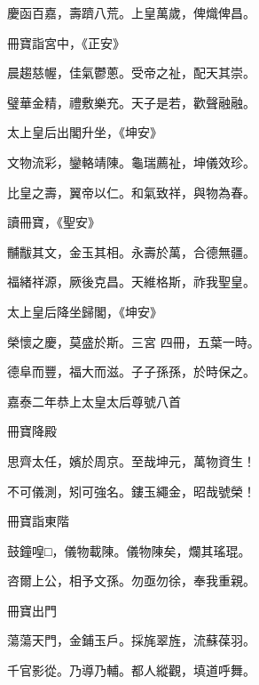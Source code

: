 \begin{pinyinscope}
 慶函百嘉，壽躋八荒。上皇萬歲，俾熾俾昌。



 冊寶詣宮中，《正安》



 晨趨慈幄，佳氣鬱蔥。受帝之祉，配天其崇。



 璧華金精，禮敷樂充。天子是若，歡聲融融。



 太上皇后出閣升坐，《坤安》



 文物流彩，鑾輅靖陳。龜瑞薦祉，坤儀效珍。



 比皇之壽，翼帝以仁。和氣致祥，與物為春。



 讀冊寶，《聖安》



 黼黻其文，金玉其相。永壽於萬，合德無疆。



 福緒祥源，厥後克昌。天維格斯，祚我聖皇。



 太上皇后降坐歸閣，《坤安》



 榮懷之慶，莫盛於斯。三宮
 四冊，五葉一時。



 德阜而豐，福大而滋。子子孫孫，於時保之。



 嘉泰二年恭上太皇太后尊號八首



 冊寶降殿



 思齊太任，嬪於周京。至哉坤元，萬物資生！



 不可儀測，矧可強名。鏤玉繩金，昭哉號榮！



 冊寶詣東階



 鼓鐘喤□，儀物載陳。儀物陳矣，爛其瑤琨。



 咨爾上公，相予文孫。勿亟勿徐，奉我重親。



 冊寶出門



 蕩蕩天門，金鋪玉戶。採旄翠旌，流蘇葆羽。



 千官影從。乃導乃輔。都人縱觀，填道呼舞。




\end{pinyinscope}
